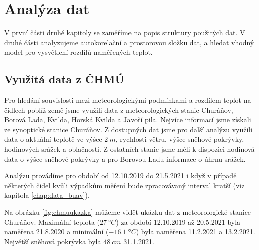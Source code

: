 \chapter{Analýza dat} \label{chap:analysis}
V první části druhé kapitoly se zaměříme na popis struktury použitých dat. V druhé části analyzujeme autokorelační a prostorovou složku dat, a hledat vhodný model pro vysvětlení rozdílů naměřených teplot.

\section{Využitá data z ČHMÚ}
Pro hledání souvislosti mezi meteorologickými podmínkami a rozdílem teplot na čidlech poblíž země jsme využili data z meteorologických stanic Churáňov, Borová Lada, Kvilda, Horská Kvilda a Javoří pila. Nejvíce informací jsme získali ze synoptické stanice Churáňov. Z dostupných dat jsme pro další analýzu využili data o aktuální teplotě ve výšce $\SI{2}{m}$, rychlosti větru, výšce sněhové pokrývky, hodinových srážek a oblačnosti. Z ostatních stanic jsme měli k dispozici hodinová data o výšce sněhové pokrývky a pro Borovou Ladu informace o úhrnu srážek.

Analýzu provádíme pro období od 12.10.2019 do 21.5.2021 i když v případě některých čidel kvůli výpadkům měření bude zpracovávaný interval kratší (viz kapitola \ref{chap:data_buav}).

Na obrázku \ref{fig:chmuukazka} můžeme vidět ukázku dat z meteorologické stanice Churáňov. Maximální teplota ($\SI{27}{\degree C}$) za období 12.10.2019 až 20.5.2021 byla naměřena 21.8.2020 a minimální ($\SI{-16.1}{\degree C}$) byla naměřena 11.2.2021 a 13.2.2021. Největší sněhová pokrývka byla $\SI{48}{cm}$ 31.1.2021.

